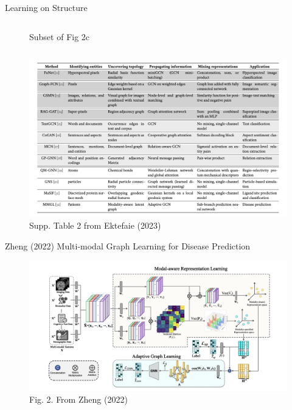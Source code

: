 \documentclass{beamer}
\begin{document}
\begin{frame}{Learning on Structure}
\begin{columns}[T]
\begin{column}{0.5\textwidth}
\begin{figure}
            \caption{Subset of Fig 2c \cite{ektefaie_multimodal_2023}}
        \end{figure}    
    \end{column}
\end{columns}
\end{frame}

\begin{frame}{}
    \begin{figure}
        \centering 
        \includegraphics[scale=0.4]{MGL_MethodsTable.png}
        \caption{Supp. Table 2 from Ektefaie (2023) \cite{ektefaie_multimodal_2023}}
    \end{figure}
\end{frame}

\begin{frame}{Zheng (2022) Multi-modal Graph Learning for Disease Prediction }
    \begin{figure}
        \centering 
        \includegraphics[scale=0.4]{Zheng_2022_MGL_Patients_Arch.png}
        \caption{Fig. 2. From Zheng (2022) \cite{zheng_multi-modal_2022}}
    \end{figure}
\end{frame}
\end{document}
